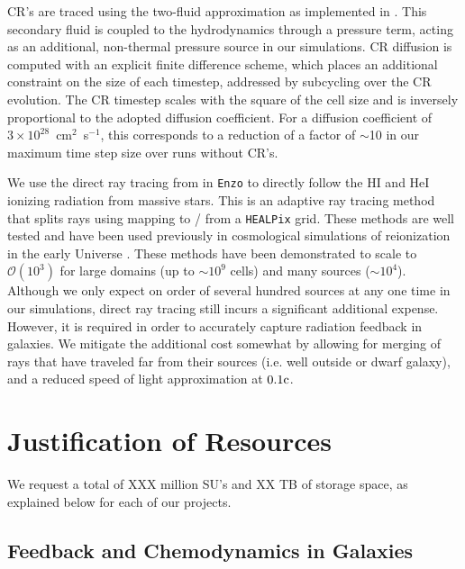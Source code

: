\documentclass[11pt]{article}
\begin{document}
CR's are traced using the two-fluid approximation as implemented in \cite{SalemBryan2014}. This secondary fluid is coupled to the hydrodynamics through a pressure term, acting as an additional, non-thermal pressure source in our simulations. CR diffusion is computed with an explicit finite difference scheme, which places an additional constraint on the size of each timestep, addressed by subcycling over the CR evolution. The CR timestep scales with the square of the cell size and is inversely proportional to the adopted diffusion coefficient. For a diffusion coefficient of $3\times10^{28}$~cm$^{2}$~s$^{-1}$, this corresponds to a reduction of a factor of $\sim$10 in our maximum time step size over runs without CR's.

We use the direct ray tracing from \cite{WiseAbel2011} in \texttt{Enzo} to directly follow the HI and HeI ionizing radiation from massive stars. This is an adaptive ray tracing method that splits rays using mapping to / from a \texttt{HEALPix} grid. These methods are well tested and have been used previously in cosmological simulations of reionization in the early Universe \citep{Wise2012a, WiseAbel2012,Wise2014, Kim2013a, Kim2013b}. These methods have been demonstrated to scale to $\mathcal{O}(10^{3})$ for large domains (up to $\sim 10^9$ cells) and many sources ($\sim10^{4}$). Although we only expect on order of several hundred sources at any one time in our simulations, direct ray tracing still incurs a significant additional expense. However, it is required in order to accurately capture radiation feedback in galaxies. We mitigate the additional cost somewhat by allowing for merging of rays that have traveled far from their sources (i.e. well outside or dwarf galaxy), and a reduced speed of light approximation at $0.1\rm{c}$.

\section{Justification of Resources}

We request a total of XXX million SU's and XX TB of storage space, as explained below for each of our projects.

\subsection{Feedback and Chemodynamics in Galaxies}
\end{document}
